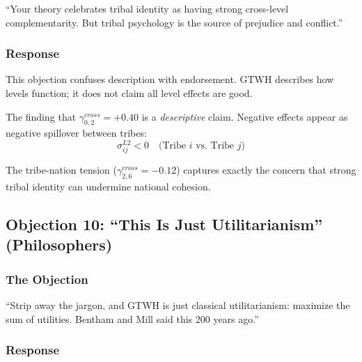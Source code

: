 \begin{tcolorbox}[colback=red!5!white, colframe=red!75!black, title=Psychologist's Objection]
``Your theory celebrates tribal identity as having strong cross-level 
complementarity. But tribal psychology is the source of prejudice and conflict.''
\end{tcolorbox}

\subsubsection{Response}

This objection confuses description with endorsement. GTWH describes how 
levels function; it does not claim all level effects are good.

The finding that $\gamma^{cross}_{0,2} = +0.40$ is a \textit{descriptive} 
claim. Negative effects appear as negative spillover between tribes:
\begin{equation}
\sigma^{L2}_{ij} < 0 \quad \text{(Tribe } i \text{ vs. Tribe } j \text{)}
\end{equation}

The tribe-nation tension ($\gamma^{cross}_{2,6} = -0.12$) captures exactly the 
concern that strong tribal identity can undermine national cohesion.

\subsection{Objection 10: ``This Is Just Utilitarianism'' (Philosophers)}

\subsubsection{The Objection}

\begin{tcolorbox}[colback=red!5!white, colframe=red!75!black, title=Philosopher's Objection]
``Strip away the jargon, and GTWH is just classical utilitarianism: maximize 
the sum of utilities. Bentham and Mill said this 200 years ago.''
\end{tcolorbox}

\subsubsection{Response}

